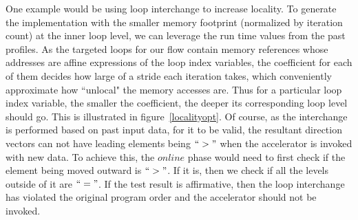 One example would be using loop interchange to increase locality. 
To generate the implementation with the smaller memory footprint (normalized by iteration count) at the inner loop level, we can leverage the run time values from the past profiles.
As the targeted loops for our flow contain memory references whose addresses are affine expressions of the loop index variables, the coefficient for each of them decides how large of a stride each iteration takes, which conveniently approximate how ``unlocal" the memory accesses are.
Thus for a particular loop index variable, the smaller the coefficient, the deeper its corresponding loop level should go. This is illustrated in figure~\ref{localityopt}. Of course, as the interchange is performed
based on past input data, for it to be valid, the resultant direction vectors can not have leading elements being $``>"$ when the accelerator is invoked with new data.
To achieve this, the $online$ phase would need to
first check if the element being moved outward is $``>"$. If it is, then we check if all the levels outside of it are $``="$. If the test result is affirmative, then the loop interchange has violated the 
original program order and the accelerator should not be invoked. %



